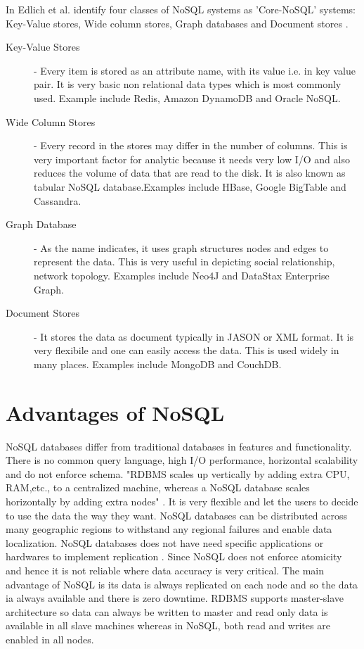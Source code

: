 \documentclass[sigconf]{acmart}
\begin{document}
In Edlich et al. identify four classes of NoSQL systems as 'Core-NoSQL' systems: Key-Value stores, Wide column stores, Graph databases and Document stores \cite{edmodel}.
\begin{description}

\item[Key-Value Stores] - Every item is stored as an attribute name, with its value i.e. in key value pair. It is very basic non relational data types which is most commonly used. Example include Redis, Amazon DynamoDB and Oracle NoSQL. 

\item[Wide Column Stores] - Every record in the stores may differ in the number of columns. This is very important factor for analytic because it needs very low I/O and also reduces the volume of data that are read to the disk. It is also known as tabular NoSQL database.Examples include HBase, Google BigTable and Cassandra.

\item[Graph Database] - As the name indicates, it uses graph structures nodes and edges to represent the data. This is very useful in depicting social relationship, network topology. Examples include Neo4J and DataStax Enterprise Graph. 

\item[Document Stores] - It stores the data as document typically in JASON or XML format. It is very flexibile and one can easily access the data. This is used widely in many places. Examples include MongoDB and CouchDB.
\end{description}

\section{Advantages of NoSQL}

NoSQL databases differ from traditional databases in features and functionality. There is no common query language, high I/O performance, horizontal scalability and do not enforce schema. "RDBMS scales up vertically by adding extra CPU, RAM,etc., to a centralized machine, whereas a NoSQL database scales horizontally by adding extra nodes" \cite{DataStax}. It is very flexible and let the users to decide to use the data the way they want. NoSQL databases can be distributed across many geographic regions to withstand any regional failures and enable data localization. NoSQL databases does not have need specific applications or hardwares to implement replication \cite{mongo}. Since NoSQL does not enforce atomicity and hence it is not reliable where data accuracy is very critical. The main advantage of NoSQL is its data is always replicated on each node and so the data ia always available and there is zero downtime. RDBMS supports master-slave architecture so data can always be written to master and read only data is available in all slave machines whereas in NoSQL, both read and writes are enabled in all nodes.
\end{document}
